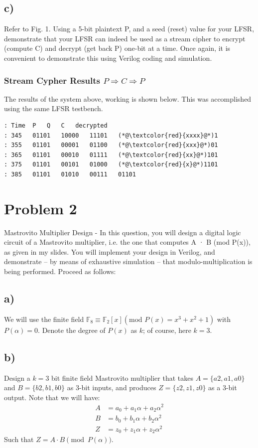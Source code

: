 \documentclass[a4paper,11pt]{exam}
\begin{document}
\subsection{c)}
\label{sec:orge4d5bfc}
Refer to Fig. 1. Using a 5-bit plaintext P, and a seed (reset) value for your LFSR, demonstrate that your LFSR can indeed be used as a stream cipher to encrypt (compute C) and decrypt (get back P) one-bit at a time. Once again, it is convenient to demonstrate this using Verilog coding and simulation.
\subsubsection{Stream Cypher Results \(P\Rightarrow{}C\Rightarrow{}P\)}
\label{sec:orgaa4711b}
The results of the system above, working is shown below. This was accomplished using the same LFSR testbench.
\begin{lstlisting}
: Time	P	Q	C	decrypted
: 345	01101	10000	11101	(*@\textcolor{red}{xxxx}@*)1
: 355	01101	00001	01100	(*@\textcolor{red}{xxx}@*)01
: 365	01101	00010	01111	(*@\textcolor{red}{xx}@*)101
: 375	01101	00101	01000	(*@\textcolor{red}{x}@*)1101
: 385	01101	01010	00111	01101
  \end{lstlisting}

\section{Problem 2}
\label{sec:org93f0c14}
Mastrovito Multiplier Design - In this question, you will design a digital logic circuit of a Mastrovito multiplier, i.e. the one that computes A · B (mod P(x)), as given in my slides. You will implement your design in Verilog, and demonstrate – by means of exhaustive simulation – that modulo-multiplication is being performed. Proceed as follows:

\subsection{a)}
\label{sec:org9e5e61a}

We will use the finite field \(\mathbb{F}_8 \equiv \mathbb{F}_2[x] (\text{mod } P(x) = x^3 + x^2 + 1)\) with \(P(\alpha) = 0\). Denote the degree of  \(P(x)\) as \(k\); of course, here \(k = 3\).
\subsection{b)}
\label{sec:org0473801}
Design a \(k = 3\) bit finite field Mastrovito multiplier that takes \(A = \{a2 , a1 , a0\}\) and \(B = \{b2 , b1, b0 \}\) as 3-bit inputs, and produces \(Z = \{z2, z1 , z0 \}\) as a 3-bit output. Note that we will have:
\begin{align*}
A &= a_0 + a_1 \alpha + a_2\alpha^2\\
B &= b_0 + b_1 \alpha + b_2\alpha^2\\
Z &= z_0 + z_1 \alpha + z_2\alpha^2
\end{align*}
Such that \(Z = A \cdot B\pmod{P(\alpha)}\).
\end{document}
